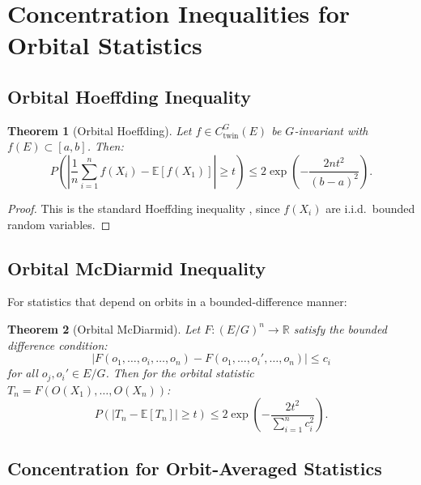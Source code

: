 \documentclass[11pt]{article}
\newtheorem{theorem}{Theorem}[section]
\newcommand{\R}{\mathbb{R}}
\newcommand{\E}{\mathbb{E}}
\begin{document}
\section{Concentration Inequalities for Orbital Statistics}
\label{sec:concentration}

\subsection{Orbital Hoeffding Inequality}

\begin{theorem}[Orbital Hoeffding]\label{thm:orbital_hoeffding}
Let $f \in C_{\mathrm{twin}}^G(E)$ be $G$-invariant with $f(E) \subset [a, b]$. Then:
\begin{equation}\label{eq:orbital_hoeffding}
P\left( \left| \frac{1}{n} \sum_{i=1}^n f(X_i) - \E[f(X_1)] \right| \geq t \right) \leq 2 \exp\left( -\frac{2nt^2}{(b-a)^2} \right).
\end{equation}
\end{theorem}

\begin{proof}
This is the standard Hoeffding inequality \citep{Hoeffding1963}, since $f(X_i)$ are i.i.d.\ bounded random variables.
\end{proof}

\subsection{Orbital McDiarmid Inequality}

For statistics that depend on orbits in a bounded-difference manner:

\begin{theorem}[Orbital McDiarmid]\label{thm:orbital_mcdiarmid}
Let $F : (E/G)^n \to \R$ satisfy the bounded difference condition:
\begin{equation}\label{eq:bounded_diff}
|F(o_1, \ldots, o_i, \ldots, o_n) - F(o_1, \ldots, o_i', \ldots, o_n)| \leq c_i
\end{equation}
for all $o_j, o_i' \in E/G$. Then for the orbital statistic $T_n = F(O(X_1), \ldots, O(X_n))$:
\begin{equation}\label{eq:mcdiarmid}
P(|T_n - \E[T_n]| \geq t) \leq 2 \exp\left( -\frac{2t^2}{\sum_{i=1}^n c_i^2} \right).
\end{equation}
\end{theorem}

\subsection{Concentration for Orbit-Averaged Statistics}
\end{document}
